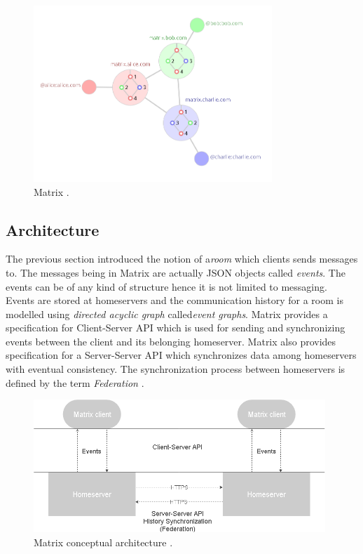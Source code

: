 \begin{figure}[H]
	\centering
	\includegraphics[width=9cm]{figures/matrix5.png}
	\caption{ Matrix \cite{matrixhome}.}
	\label{fig:matrix5}
\end{figure}



\subsection{Architecture} \label{matrix:architecture}
The previous section introduced the notion of a\emph{room} which clients sends messages to. The messages being in Matrix are actually JSON objects called \emph{events}. The events can be of any kind of structure hence it is not limited to messaging. Events are stored at homeservers and the communication history for a room is modelled using \emph{directed acyclic graph} called\emph{event graphs}. Matrix provides a specification for Client-Server API which is used for sending and synchronizing events between the client and its belonging homeserver. Matrix also provides specification for a Server-Server API which synchronizes data among homeservers with eventual consistency. The synchronization process between homeservers is defined by the term \emph{Federation} \cite{matrixspec}. 


\begin{figure}[H]
	\centering
	\includegraphics[width=11cm]{figures/matrix_architecture.png}
	\caption{ Matrix conceptual architecture \cite{matrixspec}.}
	\label{fig:matrix_architecture}
\end{figure}


